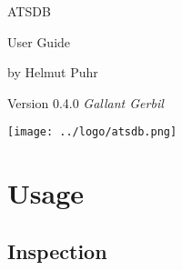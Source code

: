 \documentclass[10pt,letterpaper,extrafontsizes]{memoir}
\begin{document}
\firmlists
\midsloppy
\raggedbottom


%

\frontmatter
\pagestyle{empty}


\vspace*{\fill}
\begin{center}
\HUGE\textsf{ATSDB}\par
\end{center}

\begin{center}
\Huge\textsf{User Guide}\par
\end{center}
\begin{center}
\normalsize\textsf{by Helmut Puhr}\par
\medskip
\normalsize\textsf{Version 0.4.0 \textit{Gallant Gerbil}}\par
\end{center}
\vspace*{\fill}
\begin{center}
\texttt{[image: ../logo/atsdb.png]}
\setlength{\droptitle}{0pt}%
\end{center}
\clearpage

\cleardoublepage

\pagestyle{headings}

\setupshorttoc
\tableofcontents
\clearpage
\setupparasubsecs
\setupmaintoc
\tableofcontents
\setlength{\unitlength}{1pt}
\clearpage
\listoffigures
\clearpage
\listoftables
\clearpage









\chapter{Usage}
\label{sec:usage}







\section{Inspection}
\label{sec:inspection}
\end{document}
